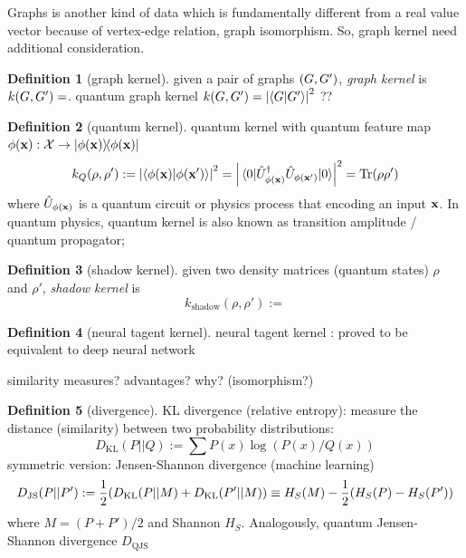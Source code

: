 \documentclass[
10pt,
aps,
pra,
linenumbers,
floatfix,
]{revtex4-2}
\theoremstyle{plain}
\theoremstyle{definition}
\newtheorem{definition}{Definition}
\newcommand{\kernel}{k}
\newcommand{\jsd}{D_\text{JS}}
\newcommand{\kl}{D_\text{KL}}
\newcommand{\shadow}{\text{shadow}}
\newcommand{\U}{\hat{U}}
\begin{document}
Graphs is another kind of data which is fundamentally different from a real value vector because of vertex-edge relation, graph isomorphism.
So, graph kernel \cite{kriegeSurveyGraphKernels2020} need additional consideration.
\begin{definition}[graph kernel]\label{def:graph_kernel}
	given a pair of graphs $(G,G')$,
	\emph{graph kernel} is $\kernel (\graph,\graph')  =$.
	quantum graph kernel $\kernel (\graph,\graph')  = \abs{\ip{\graph}{\graph'}}^2$ ??
	\cite{baiQuantumJensenShannon2015}	
\end{definition}
\begin{definition}[quantum kernel]\label{def:quantum_kernel}
	quantum kernel 
	with quantum feature map $\phi(\vb{x}): \mathcal{X}\to \op{\phi(\vb{x})}$
	\begin{equation}
		k_Q(\rho,\rho') := \abs{\ip{\phi(\vbx)}{\phi(\vbx')}}^2 =\abs{\mel{0}{\U_{\phi(\vbx)}^\dagger \U_{\phi(\vbx')} }{0}}^2 = \Tr(\rho\rho')
	\end{equation}
	where $\U_{\phi(\vbx)}$ is a quantum circuit or physics process that encoding an input $\vb{x}$.
	In quantum physics, quantum kernel is also known as transition amplitude / quantum propagator;
\end{definition}
\begin{definition}[shadow kernel]
	given two density matrices (quantum states) $\rho$ and $\rho'$,
	\emph{shadow kernel} \cite{huangPredictingManyProperties2020} is 
	\begin{equation}
		k_{\shadow}(\rho,\rho') := 
	\end{equation}	
\end{definition}
\begin{definition}[neural tagent kernel]
	neural tagent kernel \cite{jacotNeuralTangentKernel2020}: proved to be equivalent to deep neural network \cite{gaoEfficientRepresentationQuantum2017}	
\end{definition}
similarity measures? advantages? why? (isomorphism?)
\begin{definition}[divergence]\label{def:divergence}
	KL divergence (relative entropy): measure the distance (similarity) between two probability distributions:
	\begin{equation}
		\kl (P || Q) := \sum P(x) \log (P(x)/Q(x))
	\end{equation}
	symmetric version: Jensen-Shannon divergence (machine learning)
	\begin{equation}
		\jsd (P || P') := \frac{1}{2} \qty(\kl(P|| M) + \kl(P'||M))
		\equiv H_S(M)-\frac{1}{2} (H_S(P) - H_S(P') ) 
	\end{equation}
	where $M=(P+P')/2$ and Shannon  $H_S$.
	Analogously, quantum Jensen-Shannon divergence $D_{\text{QJS}}$
\end{definition}
\end{document}
